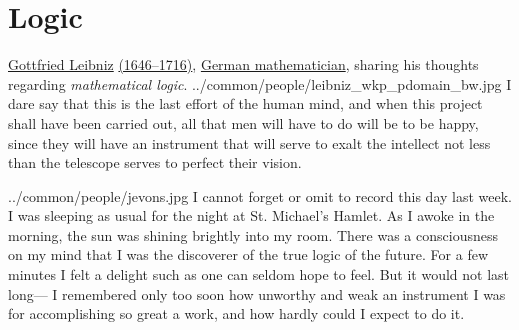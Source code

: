 
\chapter{Logic}
\label{chp:logic}
\qboxnps
  {\href{http://en.wikipedia.org/wiki/Gottfried_Leibniz}{Gottfried Leibniz}
   \href{http://www-history.mcs.st-andrews.ac.uk/Timelines/TimelineC.html}{(1646--1716)},
   \href{http://www-history.mcs.st-andrews.ac.uk/BirthplaceMaps/Places/Germany.html}{German mathematician},
   sharing his thoughts regarding \emph{mathematical logic}.
   \footnotemark
  }
  {../common/people/leibniz_wkp_pdomain_bw.jpg}
  {I dare say that this is the last effort of the human mind, and
    when this project shall have been carried out,
    all that men will have to do will be to be happy,
    since they will have an instrument that will serve to exalt the intellect
    not less than the telescope serves to perfect their vision.}

  {../common/people/jevons.jpg}
  {I cannot forget or omit to record this day last week. 
    I was sleeping as usual for the night at St. Michael's Hamlet. 
    As I awoke in the morning, the sun was shining brightly into my room. 
    There was a consciousness on my mind that I was the discoverer 
    of the true logic of the future. 
    For a few minutes I felt a delight such as one can seldom hope to feel. 
    But it would not last long---
    I remembered only too soon how unworthy and weak an instrument 
    I was for accomplishing so great a work, 
    and how hardly could I expect to do it.}


